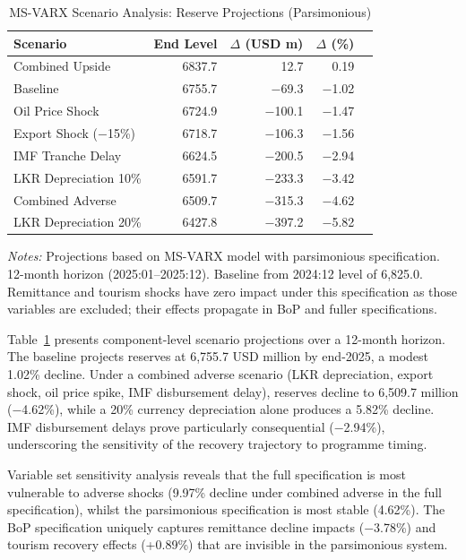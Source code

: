 \documentclass[12pt,a4paper]{article}
\begin{document}
\begin{table}[htbp]
\centering
\caption{MS-VARX Scenario Analysis: Reserve Projections (Parsimonious)}
\label{tab:scenarios}
\begin{tabular}{lrrrr}
\toprule
Scenario & End Level & $\Delta$ (USD m) & $\Delta$ (\%) \\
\midrule
Combined Upside & 6837.7 & 12.7 & 0.19 \\
Baseline & 6755.7 & $-$69.3 & $-$1.02 \\
Oil Price Shock & 6724.9 & $-$100.1 & $-$1.47 \\
Export Shock ($-$15\%) & 6718.7 & $-$106.3 & $-$1.56 \\
IMF Tranche Delay & 6624.5 & $-$200.5 & $-$2.94 \\
LKR Depreciation 10\% & 6591.7 & $-$233.3 & $-$3.42 \\
Combined Adverse & 6509.7 & $-$315.3 & $-$4.62 \\
LKR Depreciation 20\% & 6427.8 & $-$397.2 & $-$5.82 \\
\bottomrule
\end{tabular}
\begin{tablenotes}
\small
\item \textit{Notes:} Projections based on MS-VARX model with parsimonious specification. 12-month horizon (2025:01--2025:12). Baseline from 2024:12 level of 6,825.0. Remittance and tourism shocks have zero impact under this specification as those variables are excluded; their effects propagate in BoP and fuller specifications.
\end{tablenotes}
\end{table}

Table~\ref{tab:scenarios} presents component-level scenario projections over a 12-month horizon. The baseline projects reserves at 6,755.7 USD million by end-2025, a modest 1.02\% decline. Under a combined adverse scenario (LKR depreciation, export shock, oil price spike, IMF disbursement delay), reserves decline to 6,509.7 million ($-$4.62\%), while a 20\% currency depreciation alone produces a 5.82\% decline. IMF disbursement delays prove particularly consequential ($-$2.94\%), underscoring the sensitivity of the recovery trajectory to programme timing.

Variable set sensitivity analysis reveals that the full specification is most vulnerable to adverse shocks (9.97\% decline under combined adverse in the full specification), whilst the parsimonious specification is most stable (4.62\%). The BoP specification uniquely captures remittance decline impacts ($-$3.78\%) and tourism recovery effects (+0.89\%) that are invisible in the parsimonious system.
\end{document}
